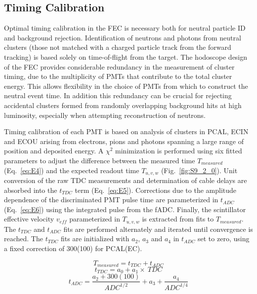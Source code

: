 \subsection{Timing Calibration}

Optimal timing calibration in the FEC is necessary both for neutral particle ID and background rejection.  Identification of neutrons and photons from neutral clusters (those not matched with a charged particle track from the forward tracking) is based solely on time-of-flight from the target.  The hodoscope design of the FEC provides considerable redundancy in the measurement of cluster timing, due to the multiplicity of PMTs that contribute to the total cluster energy.  This allows flexibility in the choice of PMTs from which to construct the neutral event time.  In addition this redundancy can be crucial for rejecting accidental clusters formed from randomly overlapping background hits at high luminosity, especially when attempting reconstruction of neutrons. 

Timing calibration of each PMT is based on analysis of clusters in PCAL, ECIN and ECOU arising from electrons, pions and photons spanning a large range of position and deposited energy.   A $\chi^2$ minimization is performed using six fitted parameters to adjust the difference between the measured time $T_{measured}$ (Eq.~\ref{eq:E4}) and the expected readout time $T_{u,v,w}$ (Fig.~\ref{fig:S9_2_0}).  Unit conversion of the raw TDC measurements and determination of cable delays are absorbed into the $t_{TDC}$ term (Eq.~\ref{eq:E5}).  Corrections due to the amplitude dependence of the discriminated PMT pulse time are parameterized in $t_{ADC}$ (Eq.~\ref{eq:E6}) using the integrated pulse from the fADC.  Finally, the scintillator effective velocity $v_{eff}$ parameterized in $T_{u,v,w}$ is extracted from fits to $T_{measured}$.  The $t_{TDC}$ and $t_{ADC}$ fits are performed alternately and iterated until convergence is reached.  The $t_{TDC}$ fits are initialized with $a_2$, $a_3$ and $a_4$ in $t_{ADC}$ set to zero, using a fixed correction of 300(100) for PCAL(EC).

\begin{equation}
T_{measured}=t_{TDC}+t_{ADC} \label{eq:E4}
\end{equation}
\begin{equation}
t_{TDC}=a_0+a_1\times~TDC \label{eq:E5}
\end{equation}
\begin{equation}
t_{ADC}=\frac{a_2+300(100)}{ADC^{1/2}}+a_3+\frac{a_4}{ADC^{1/4}} \label{eq:E6}
\end{equation}

